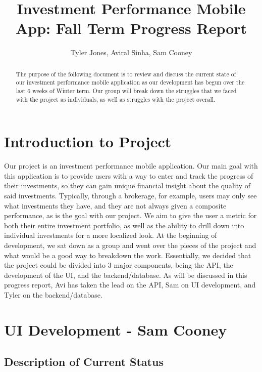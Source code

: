\documentclass[letterpaper,10pt,titlepage,journal,compsoc,draftclsnofoot,onecolumn]{IEEEtran}
\title{Investment Performance Mobile App: Fall Term Progress Report}
\author{Tyler Jones, Aviral Sinha, Sam Cooney}
\newcommand\tab[1][1cm]{\hspace*{#1}}
\begin{document}
\begin{titlingpage}
    \maketitle
	\centering{}
    \begin{abstract}
        
     The purpose of the following document is to review and discuss the current state of our investment performance mobile application as our development has begun over the last 6 weeks of Winter term. Our group will break down the struggles that we faced with the project as individuals, as well as struggles with the project overall.
        
    \end{abstract}
\end{titlingpage}

\newpage

\tableofcontents{}

\newpage

\section{Introduction to Project}

\tab Our project is an investment performance mobile application. Our main goal with this application is to provide users with a way to enter and track the progress of their investments, so they can gain unique financial insight about the quality of said investments. Typically, through a brokerage, for example, users may only see what investments they have, and they are not always given a composite performance, as is the goal with our project. We aim to give the user a metric for both their entire investment portfolio, as well as the ability to drill down into individual investments for a more localized look. At the beginning of development, we sat down as a group and went over the pieces of the project and what would be a good way to breakdown the work. Essentially, we decided that the project could be divided into 3 major components, being the API, the development of the UI, and the backend/database. As will be discussed in this progress report, Avi has taken the lead on the API, Sam on UI development, and Tyler on the backend/database.

\section{UI Development - Sam Cooney}
\subsection{Description of Current Status}
\end{document}
